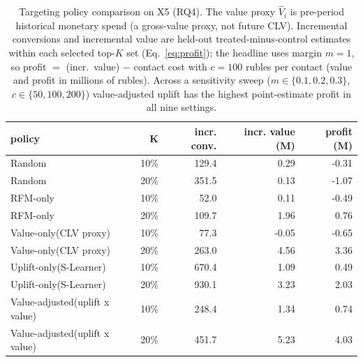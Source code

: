 \begin{table}[t]\centering
\caption{Targeting policy comparison on X5 (RQ4). The value proxy $\hat V_i$ is pre-period historical monetary spend (a gross-value proxy, not future CLV). Incremental conversions and incremental value are held-out treated-minus-control estimates within each selected top-$K$ set (Eq.~\ref{eq:profit}); the headline uses margin $m=1$, so profit $=$ (incr.\ value) $-$ contact cost with $c=100$ rubles per contact (value and profit in millions of rubles). Across a sensitivity sweep ($m\in\{0.1,0.2,0.3\}$, $c\in\{50,100,200\}$) value-adjusted uplift has the highest point-estimate profit in all nine settings.}\label{tab:policy}
\begin{tabular}{lrrrr}
\hline
policy & K & incr. conv. & incr. value (M) & profit (M) \\
\hline
Random & 10\% & 129.4 & 0.29 & -0.31 \\
Random & 20\% & 351.5 & 0.13 & -1.07 \\
RFM-only & 10\% & 52.0 & 0.11 & -0.49 \\
RFM-only & 20\% & 109.7 & 1.96 & 0.76 \\
Value-only(CLV proxy) & 10\% & 77.3 & -0.05 & -0.65 \\
Value-only(CLV proxy) & 20\% & 263.0 & 4.56 & 3.36 \\
Uplift-only(S-Learner) & 10\% & 670.4 & 1.09 & 0.49 \\
Uplift-only(S-Learner) & 20\% & 930.1 & 3.23 & 2.03 \\
Value-adjusted(uplift x value) & 10\% & 248.4 & 1.34 & 0.74 \\
Value-adjusted(uplift x value) & 20\% & 451.7 & 5.23 & 4.03 \\
\hline
\end{tabular}
\end{table}

